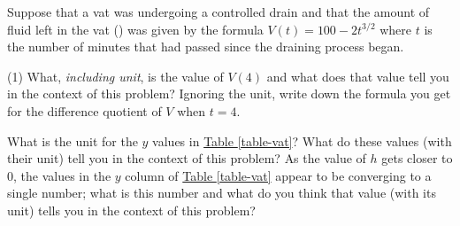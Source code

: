 \documentclass[10pt,oneside,]{book}
\theoremstyle{plain}
\theoremstyle{definition}
\numberwithin{equation}{section}
\newcommand{\hrulemedium}{\noalign{\hrule height 0.07em}}
\newcommand{\hrulethick} {\noalign{\hrule height 0.11em}}
\newcounter{figstack}
\newcounter{figindex}
\newlength\fight
\newcommand\pushValignCaptionBottom[5][b]{%
\stepcounter{figstack}%
\expandafter\def\csname %
figalign\romannumeral\value{figstack}\endcsname{#1}%
\expandafter\def\csname %
figtype\romannumeral\value{figstack}\endcsname{#2}%
\expandafter\def\csname %
figwd\romannumeral\value{figstack}\endcsname{#3}%
\expandafter\def\csname %
figcontent\romannumeral\value{figstack}\endcsname{#4}%
\expandafter\def\csname %
figcap\romannumeral\value{figstack}\endcsname{#5}%
\setbox0=\hbox{%
\begin{#2}{#3}#4\end{#2}}%
\ifdim\dimexpr\ht0+\dp0\relax>\fight\global\setlength{\fight}{%
\dimexpr\ht0+\dp0\relax}\fi%
}
\newcommand\popValignCaptionBottom{%
\setcounter{figindex}{0}%
\hfill%
\whiledo{\value{figindex}<\value{figstack}}{%
\stepcounter{figindex}%
\def\tmp{\csname figwd\romannumeral\value{figindex}\endcsname}%
\begin{\csname figtype\romannumeral\value{figindex}\endcsname}[t]{\tmp}%
\centering%
\stackinset{c}{}%
{\csname figalign\romannumeral\value{figindex}\endcsname}{}%
{\csname figcontent\romannumeral\value{figindex}\endcsname}%
{\rule{0pt}{\fight}}\par%
\csname figcap\romannumeral\value{figindex}\endcsname%
\end{\csname figtype\romannumeral\value{figindex}\endcsname}%
\hfill%
}%
\setcounter{figstack}{0}%
\setlength{\fight}{0pt}%
\hfill%
}
\newcommand{\fe}[2]{#1\mathopen{}\left(#2\right)\mathclose{}}
\begin{document}
\hypertarget{exercisegroup-vat}{\null}Suppose that a vat was undergoing a controlled drain and that the amount of fluid left in the vat (\si{\gallon}) was given by the formula \(\fe{V}{t}=100-2t^{3/2}\) where \(t\) is the number of minutes that had passed since the draining process began.%
\par
\begin{exercisegroup}(1)
\exercise[18.]\hypertarget{exercise-vat-first}{\null}What, \emph{including unit}, is the value of \(\fe{V}{4}\) and what does that value tell you in the context of this problem?%
\exercise[19.]\hypertarget{exercise-27}{\null}Ignoring the unit, write down the formula you get for the difference quotient of \(V\) when \(t=4\).%
\exercise[20.]\hypertarget{exercise-28}{\null}What is the unit for the \(y\) values in \hyperref[table-vat]{Table \ref{table-vat}}? What do these values (with their unit) tell you in the context of this problem?%
\exercise[21.]\hypertarget{exercise-vat-last}{\null}As the value of \(h\) gets closer to \(0\), the values in the \(y\) column of \hyperref[table-vat]{Table \ref{table-vat}} appear to be converging to a single number; what is this number and what do you think that value (with its unit) tells you in the context of this problem?%
\end{exercisegroup}
\par\smallskip\noindent
\typeout{************************************************}
\typeout{************************************************}
\end{document}
